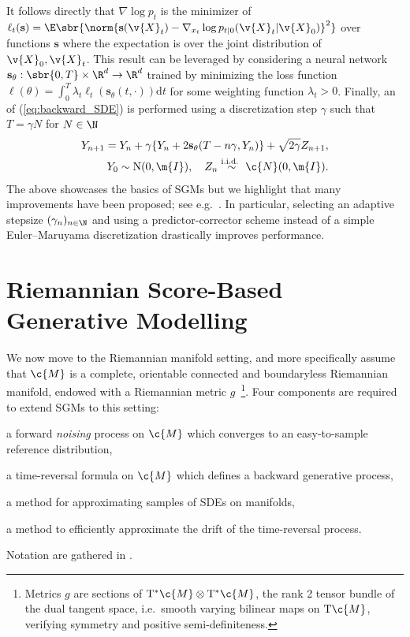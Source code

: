 It follows directly that $\nabla \log p_t$ is the minimizer of $\ell_t(\mathbf{s}) = \E\sbr{\norm{\mathbf{s}(\v{X}_t) - \nabla_{x_t} \log p_{t|0}(\v{X}_t|\v{X}_0)}^2}$ over functions $\mathbf{s}$ where the expectation is over the joint distribution of $\v{X}_0,\v{X}_t$.
This result can be leveraged by considering a neural network $\mathbf{s}_\theta: \sbr{0,T} \times \R^d \to \R^d$ trained by minimizing the loss function $\ell(\theta)=\int_0^T \lambda_t \ell_{t}(\mathbf{s}_\theta(t,\cdot))\mathrm{d} t$ for some weighting function $\lambda_t>0$.
Finally, an  of (\ref{eq:backward_SDE}) is performed using a discretization step $\gamma$ such that $T=\gamma N$ for $N \in \N$ \begin{align} \label{eq:backward_discrete_final} Y_{n+1} = Y_n + \gamma \{Y_n + 2 \mathbf{s}_\theta(T -n \gamma, Y_n) \} + \sqrt{2 \gamma} Z_{n+1}, \\ Y_0\sim \mathrm{N}(0,\m{I}), \quad Z_n \overset{\textup{i.i.d.
		}}{\sim} \c{N}(0,\m{I}). \nonumber
\end{align}
The above showcases the basics of SGMs but we highlight that many improvements have been proposed; see e.g.~\textcite{song2020improved,jolicoeur2020adversarial,nichol2021beatgans}.
In particular, selecting an adaptive stepsize $(\gamma_n)_{n \in \N}$ \parencite{bao2022analyticdpm,watson2021learning} and using a predictor-corrector scheme \parencite{song2020score} instead of a simple Euler--Maruyama discretization drastically improves performance.

\section{Riemannian Score-Based Generative Modelling}

\label{sec:score-appr-manif}
We now move to the Riemannian manifold setting, and more specifically assume that $\c{M}$ is a complete, orientable connected and boundaryless Riemannian manifold, endowed with a Riemannian metric $g$~\footnote{ Metrics $g$ are sections of $\mathrm{T}^* \c{M} \otimes \mathrm{T}^* \c{M}$, the rank 2 tensor bundle of the dual tangent space, i.e.\ smooth varying bilinear maps on $\mathrm{T} \c{M}$, verifying symmetry and positive semi-definiteness.
}.
Four components are required to extend SGMs to this setting: \begin{enumerate*}[label=\roman*)] \item a forward \emph{noising} process on $\c{M}$ which converges to an easy-to-sample reference distribution, \item a time-reversal formula on $\c{M}$ which defines a backward generative process, \item a method for approximating samples of SDEs on manifolds, \item a method to efficiently approximate the drift of the time-reversal process.
\end{enumerate*}
Notation are gathered in .

